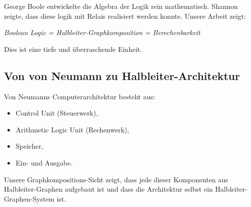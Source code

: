\documentclass[12pt, a4paper]{article}
\theoremstyle{definition}
\theoremstyle{remark}
\begin{document}
George Boole \cite{boole1854} entwickelte die Algebra der Logik rein mathematisch. Shannon \cite{shannon1938} zeigte, dass diese logik mit Relais realisiert werden konnte. Unsere Arbeit zeigt:

\begin{center}
\textit{Boolean Logic = Halbleiter-Graphkomposition = Berechenbarkeit}
\end{center}

Dies ist eine tiefe und überraschende Einheit.

\subsection{Von von Neumann zu Halbleiter-Architektur}
\label{subsec:von_neumann_halbleiter}

Von Neumanns Computerarchitektur \cite{neumann1945} besteht aus:
\begin{itemize}
  \item Control Unit (Steuerwerk),
  \item Arithmetic Logic Unit (Rechenwerk),
  \item Speicher,
  \item Ein- und Ausgabe.
\end{itemize}

Unsere Graphkompositions-Sicht zeigt, dass jede dieser Komponenten aus Halbleiter-Graphen aufgebaut ist und dass die Architektur selbst ein Halbleiter-Graphen-System ist.
\end{document}
